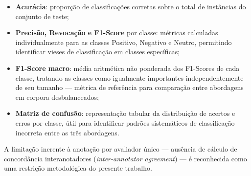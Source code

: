 \begin{itemize}
	\item \textbf{Acurácia}: proporção de classificações corretas sobre o total de instâncias do conjunto de teste;
	
	\item \textbf{Precisão, Revocação e F1-Score} por classe: métricas calculadas individualmente para as classes Positivo, Negativo e Neutro, permitindo identificar vieses de classificação em classes específicas;
	
	\item \textbf{F1-Score macro}: média aritmética não ponderada dos F1-Scores de cada classe, tratando as classes como igualmente importantes independentemente de seu tamanho --- métrica de referência para comparação entre abordagens em corpora desbalanceados;
	
	\item \textbf{Matriz de confusão}: representação tabular da distribuição de acertos e erros por classe, útil para identificar padrões sistemáticos de classificação incorreta entre as três abordagens.
\end{itemize}

A limitação inerente à anotação por avaliador único --- ausência de cálculo de concordância interanotadores (\textit{inter-annotator agreement}) --- é reconhecida como uma restrição metodológica do presente trabalho.